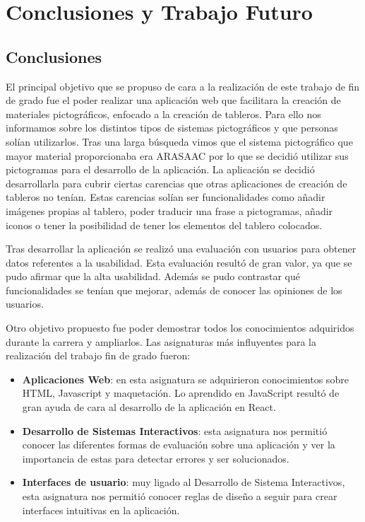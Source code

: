 \chapter{Conclusiones y Trabajo Futuro}
\label{cap:conclusiones}

\section{Conclusiones}
\label{cap7:sec:conclusiones}

El principal objetivo que se propuso de cara a la realización de este trabajo de fin de grado fue el poder realizar una aplicación web que facilitara la creación de materiales pictográficos, enfocado a la creación de tableros. Para ello nos informamos sobre los distintos tipos de sistemas pictográficos y que personas solían utilizarlos. Tras una larga búsqueda vimos que el sistema pictográfico que mayor material proporcionaba era ARASAAC por lo que se decidió utilizar sus pictogramas para el desarrollo de la aplicación. La aplicación se decidió desarrollarla para cubrir ciertas carencias que otras aplicaciones de creación de tableros no tenían. Estas carencias solían ser funcionalidades como añadir imágenes propias al tablero, poder traducir una frase a pictogramas, añadir iconos o tener la posibilidad de tener los elementos del tablero colocados. 

Tras desarrollar la aplicación se realizó una evaluación con usuarios para obtener datos referentes a la usabilidad. Esta evaluación resultó de gran valor, ya que se pudo afirmar que la alta usabilidad. Además se pudo contrastar qué funcionalidades se tenían que mejorar, además de conocer las opiniones de los usuarios.


Otro objetivo propuesto fue poder demostrar todos los conocimientos adquiridos durante la carrera y ampliarlos. Las asignaturas más influyentes para la realización del trabajo fin de grado fueron:

\begin{itemize}
	\item \textbf{Aplicaciones Web}: en esta asignatura se adquirieron conocimientos sobre HTML, Javascript y maquetación. Lo aprendido en JavaScript resultó de gran ayuda de cara al desarrollo de la aplicación en React. 
	
	\item\textbf{ Desarrollo de Sistemas Interactivos}: esta asignatura nos permitió conocer las diferentes formas de evaluación sobre una aplicación y ver la importancia de estas para detectar errores y ser solucionados.
	
	\item \textbf{Interfaces de usuario}: muy ligado al Desarrollo de Sistema Interactivos, esta asignatura nos permitió conocer reglas de diseño a seguir para crear interfaces intuitivas en la aplicación.
	
\end{itemize}


